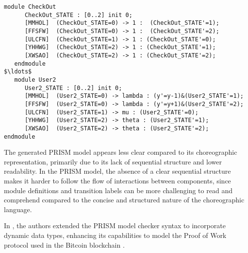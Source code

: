  \begin{lstlisting}[style=prism-color,caption={Generated PRISM program},captionpos=b,label={ex1-gen}]
   module CheckOut
      CheckOut_STATE : [0..2] init 0;
      [MMHOL]  (CheckOut_STATE=0) -> 1 :  (CheckOut_STATE'=1);
      [FFSFW]  (CheckOut_STATE=0) -> 1 :  (CheckOut_STATE'=2);
      [ULCFN]  (CheckOut_STATE=1) -> 1 : (CheckOut_STATE'=0);
      [YHHWG]  (CheckOut_STATE=2) -> 1 : (CheckOut_STATE'=1);
      [XWSAO]  (CheckOut_STATE=2) -> 1 : (CheckOut_STATE'=2);
   endmodule
$\ldots$
   module User2
      User2_STATE : [0..2] init 0;
      [MMHOL]  (User2_STATE=0) -> lambda : (y'=y-1)&(User2_STATE'=1);
      [FFSFW]  (User2_STATE=0) -> lambda : (y'=y+1)&(User2_STATE'=2);
      [ULCFN]  (User2_STATE=1) -> mu : (User2_STATE'=0);
      [YHHWG]  (User2_STATE=2) -> theta : (User2_STATE'=1);
      [XWSAO]  (User2_STATE=2) -> theta : (User2_STATE'=2);
endmodule
\end{lstlisting}
The generated PRISM model appears less clear compared to its
choreographic representation, primarily due to its lack of sequential
structure and lower readability.  In the PRISM model, the absence of a
clear sequential structure makes it harder to follow the flow of
interactions between components, %
since module definitions and transition labels can be more challenging
to read and comprehend compared to the concise and structured nature
of the choreographic language. %


\begin{comment}
\begin{wrapfigure}[11]{r}{4cm}
	\texttt{[image: bitcoin.pdf]}	
\end{wrapfigure} 
\end{comment}
In \cite{DBLP:journals/concurrency/BistarelliNGLMV23}, the authors extended the PRISM model checker syntax to incorporate dynamic data types, enhancing its capabilities to model the Proof of Work protocol used in the Bitcoin blockchain \cite{bitcoin}. 

